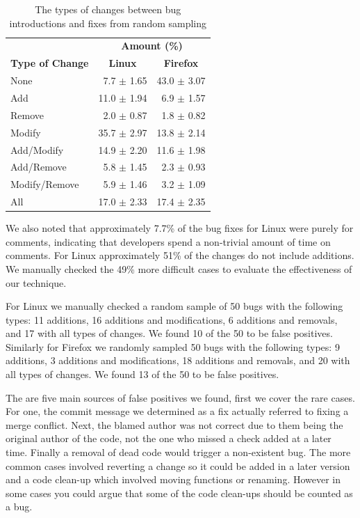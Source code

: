 \documentclass[preprint, 11pt]{sigplanconf}
\begin{document}
\begin{table}
\begin{center}
\begin{tabular}{l|r|r}
\multicolumn{1}{c}{} & \multicolumn{2}{c}{\textbf{Amount (\%)}} \\
\textbf{Type of Change} & \multicolumn{1}{c|}{\textbf{Linux}} & \multicolumn{1}{c}{\textbf{Firefox}}\\
\hline
None          &  7.7 $\pm$ 1.65 & 43.0 $\pm$ 3.07\\
\hline
Add           & 11.0 $\pm$ 1.94 & 6.9 $\pm$ 1.57\\
\hline
Remove        &  2.0 $\pm$ 0.87 & 1.8 $\pm$ 0.82\\
\hline
Modify        & 35.7 $\pm$ 2.97 & 13.8 $\pm$ 2.14\\
\hline
Add/Modify    & 14.9 $\pm$ 2.20 & 11.6 $\pm$ 1.98\\
\hline
Add/Remove    &  5.8 $\pm$ 1.45 & 2.3 $\pm$ 0.93\\
\hline
Modify/Remove &  5.9 $\pm$ 1.46 & 3.2 $\pm$ 1.09 \\
\hline
All           & 17.0 $\pm$ 2.33 & 17.4 $\pm$ 2.35\\
\end{tabular}
\end{center}
\caption{The types of changes between bug introductions and fixes from random sampling}
\label{tbl-changes}
\end{table}

We also noted that approximately 7.7\% of the bug fixes for Linux were
purely for comments, indicating that developers spend a non-trivial
amount of time on comments. For Linux approximately 51\% of the
changes do not include additions. We manually checked the 49\% more
difficult cases to evaluate the effectiveness of our technique.

For Linux we manually checked a random sample of 50 bugs with the
following types: 11 additions, 16 additions and modifications, 6 additions
and removals, and 17 with all types of changes. We found 10 of the 50
to be false positives. Similarly for Firefox we randomly sampled 50
bugs with the following types: 9 additions, 3 additions and
modifications, 18 additions and removals, and 20 with all types of
changes. We found 13 of the 50 to be false positives.

The are five main sources of false positives we found, first we cover
the rare cases. For one, the commit message we determined as a fix
actually referred to fixing a merge conflict. Next, the blamed author
was not correct due to them being the original author of the code, not
the one who missed a check added at a later time. Finally a removal of
dead code would trigger a non-existent bug. The more common cases
involved reverting a change so it could be added in a later version
and a code clean-up which involved moving functions or
renaming. However in some cases you could argue that some of the code
clean-ups should be counted as a bug.
\end{document}
